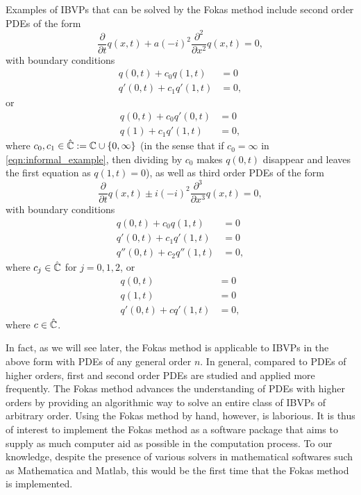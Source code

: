 \documentclass[11pt, oneside, a4paper]{article}
\begin{document}
\noindent Examples of IBVPs that can be solved by the Fokas method include second order PDEs of the form
\[\frac{\partial}{\partial t} q(x,t) + a(-i)^2 \frac{\partial^2}{\partial x^2} q(x,t) = 0,\]
with boundary conditions
\begin{equation}\label{eqn:informal_example}
    \begin{split}
    q(0,t) + c_0q(1,t) &= 0\\
    q'(0,t) + c_1q'(1,t) &= 0,
    \end{split}
\end{equation}
or
\begin{align*}
    q(0,t) + c_0 q'(0,t) &= 0\\
    q(1) + c_1 q'(1,t) &= 0,
\end{align*}
where $c_0, c_1\in\hat{\mathbb C}:=\mathbb C\cup\{0,\infty\}$ (in the sense that if $c_0=\infty$ in \ref{eqn:informal_example}, then dividing by $c_0$ makes $q(0,t)$ disappear and leaves the first equation as $q(1,t) = 0$), as well as third order PDEs of the form 
\[\frac{\partial}{\partial t} q(x,t) \pm i(-i)^2 \frac{\partial^3}{\partial x^3} q(x,t) = 0,\]
with boundary conditions
\begin{align*}
    q(0,t) + c_0 q(1,t) &= 0\\
    q'(0,t) + c_1 q'(1,t) &= 0\\
    q''(0,t) + c_2 q''(1,t) &= 0,
\end{align*}
where $c_j\in\hat{\mathbb C}$ for $j=0,1,2$, or 
\begin{align*}
    q(0,t) &= 0\\
    q(1,t) &= 0\\
    q'(0,t) + c q'(1,t) &= 0,
\end{align*}
where $c\in\hat{\mathbb C}$. 

In fact, as we will see later, the Fokas method is applicable to IBVPs in the above form with PDEs of any general order $n$. In general, compared to PDEs of higher orders, first and second order PDEs are studied and applied more frequently. The Fokas method advances the understanding of PDEs with higher orders by providing an algorithmic way to solve an entire class of IBVPs of arbitrary order. Using the Fokas method by hand, however, is laborious. It is thus of interest to implement the Fokas method as a software package that aims to supply as much computer aid as possible in the computation process. To our knowledge, despite the presence of various solvers in mathematical softwares such as Mathematica and Matlab, this would be the first time that the Fokas method is implemented. 
\end{document}
